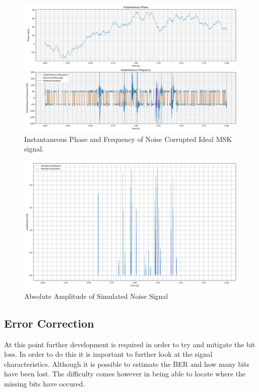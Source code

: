\begin{figure}[h!]
    \centering
    \includegraphics[width = \textwidth]{figs/sim/symRecovery/noiseFreq.png}
    \caption{Instantaneous Phase and Frequency of Noise Corrupted Ideal MSK signal.}
    \label{fig:noisefreq}
\end{figure}

\begin{figure}[h!]
    \centering
    \includegraphics[width = \textwidth]{figs/sim/symRecovery/NoiseAmp.png}
    \caption{Absolute Amplitude of Simulated Noise Signal}
    \label{fig:noiseamp}
\end{figure}

\pagebreak
\subsection{Error Correction}
At this point further development is required in order to try and mitigate the bit loss. In order to do this it is important to further look at the signal characteristics. Although it is possible to estimate the BER and how many bits have been lost. The difficulty comes however in being able to locate where the missing bits have occured.


